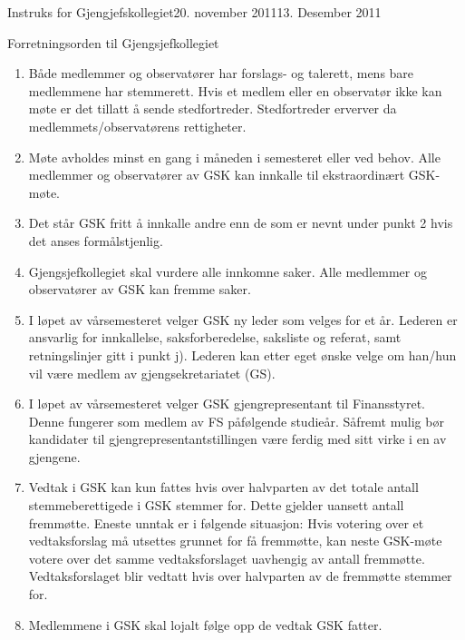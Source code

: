 \begin{instruks}{Instruks for Gjengjefskollegiet}{20. november 2011}{13. Desember 2011}
    \begin{instruksledd}{Forretningsorden til Gjengsjefkollegiet}
        \begin{enumerate}
            \item Både medlemmer og observatører har forslags- og talerett, mens bare medlemmene
                har stemmerett. Hvis et
                medlem eller en observatør ikke kan møte er det tillatt å sende stedfortreder.
                Stedfortreder erverver da
                medlemmets/observatørens rettigheter.
            \item Møte avholdes minst en gang i måneden i semesteret eller ved behov. Alle
                medlemmer og observatører av
                GSK kan innkalle til ekstraordinært GSK-møte.
            \item Det står GSK fritt å innkalle andre enn de som er nevnt under punkt 2 hvis det
                anses formålstjenlig.
            \item Gjengsjefkollegiet skal vurdere alle innkomne saker. Alle medlemmer og
                observatører av GSK kan fremme
                saker.
            \item I løpet av vårsemesteret velger GSK ny leder som velges for et år. Lederen er
                ansvarlig for innkallelse,
                saksforberedelse, saksliste og referat, samt retningslinjer gitt i punkt j).
                Lederen kan etter eget ønske velge
                om han/hun vil være medlem av gjengsekretariatet (GS).
            \item
                I løpet av vårsemesteret velger GSK gjengrepresentant til Finansstyret. Denne
                fungerer som medlem av FS
                påfølgende studieår. Såfremt mulig bør kandidater til gjengrepresentantstillingen
                være ferdig med sitt virke i
                en av gjengene.
            \item Vedtak i GSK kan kun fattes hvis over halvparten av det totale antall
                stemmeberettigede i GSK stemmer for.
                Dette gjelder uansett antall fremmøtte. Eneste unntak er i følgende situasjon:
                Hvis votering over et
                vedtaksforslag må utsettes grunnet for få fremmøtte, kan neste GSK-møte votere
                over det samme
                vedtaksforslaget uavhengig av antall fremmøtte. Vedtaksforslaget blir vedtatt hvis
                over halvparten av de
                fremmøtte stemmer for.
            \item Medlemmene i GSK skal lojalt følge opp de vedtak GSK fatter.

\end{enumerate}
\end{instruksledd}
\end{instruks}

